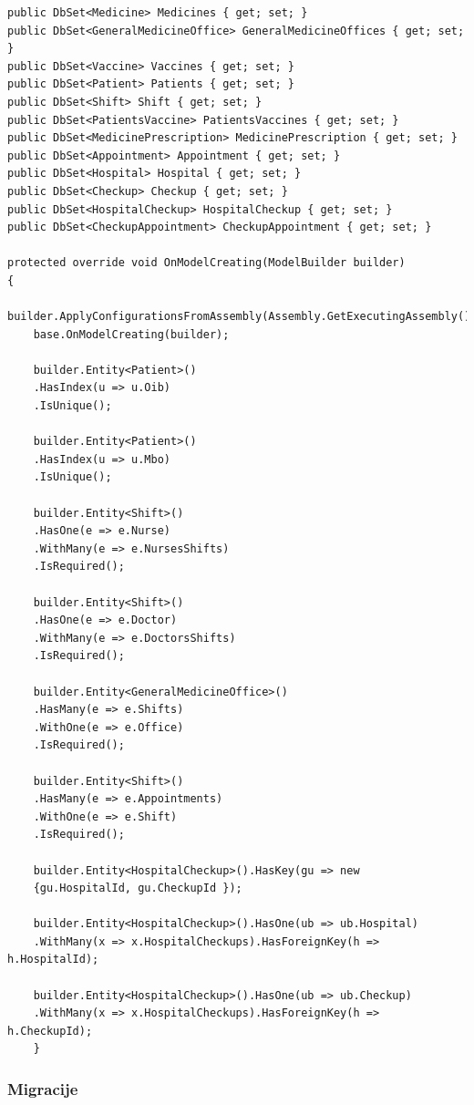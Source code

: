 \begin{lstlisting}[caption={DatabaseContext.cs datoteka}, label=dbContext]
public DbSet<Medicine> Medicines { get; set; }
public DbSet<GeneralMedicineOffice> GeneralMedicineOffices { get; set; }
public DbSet<Vaccine> Vaccines { get; set; }
public DbSet<Patient> Patients { get; set; }
public DbSet<Shift> Shift { get; set; }
public DbSet<PatientsVaccine> PatientsVaccines { get; set; }
public DbSet<MedicinePrescription> MedicinePrescription { get; set; }
public DbSet<Appointment> Appointment { get; set; }
public DbSet<Hospital> Hospital { get; set; }
public DbSet<Checkup> Checkup { get; set; }
public DbSet<HospitalCheckup> HospitalCheckup { get; set; }
public DbSet<CheckupAppointment> CheckupAppointment { get; set; }

protected override void OnModelCreating(ModelBuilder builder)
{
	builder.ApplyConfigurationsFromAssembly(Assembly.GetExecutingAssembly());
	base.OnModelCreating(builder);

	builder.Entity<Patient>()
	.HasIndex(u => u.Oib)
	.IsUnique();

    builder.Entity<Patient>()
    .HasIndex(u => u.Mbo)
    .IsUnique();

    builder.Entity<Shift>()
    .HasOne(e => e.Nurse)
    .WithMany(e => e.NursesShifts)
    .IsRequired();

    builder.Entity<Shift>()
    .HasOne(e => e.Doctor)
    .WithMany(e => e.DoctorsShifts)
    .IsRequired();

    builder.Entity<GeneralMedicineOffice>()
    .HasMany(e => e.Shifts)
    .WithOne(e => e.Office)
    .IsRequired();

    builder.Entity<Shift>()
    .HasMany(e => e.Appointments)
    .WithOne(e => e.Shift)
    .IsRequired();

    builder.Entity<HospitalCheckup>().HasKey(gu => new 
    {gu.HospitalId, gu.CheckupId });

    builder.Entity<HospitalCheckup>().HasOne(ub => ub.Hospital)
    .WithMany(x => x.HospitalCheckups).HasForeignKey(h => h.HospitalId);

    builder.Entity<HospitalCheckup>().HasOne(ub => ub.Checkup)
    .WithMany(x => x.HospitalCheckups).HasForeignKey(h => h.CheckupId);
    }
\end{lstlisting}



\subsubsection{Migracije}

